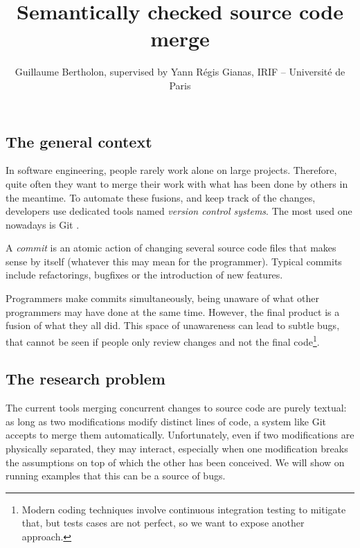 \documentclass[a4paper,11pt]{article}
\title{Semantically checked source code merge}
\author{Guillaume Bertholon, supervised by Yann Régis Gianas, IRIF -- Université de Paris}
\newcommand\todo[1]{{\color{teal}(\textbf{TODO:} #1)}}
\begin{document}
\maketitle


\subsection*{The general context}


In software engineering, people rarely work alone on large
projects. Therefore, quite often they want to merge their work with
what has been done by others in the meantime.
%
To automate these fusions, and keep track of the changes, developers use dedicated tools named \textit{version control systems}. The most used one nowadays is Git \cite{git}.

A \textit{commit} is an atomic action of changing several source code
files that makes sense by itself (whatever this may mean for the
programmer). Typical commits include refactorings, bugfixes or the
introduction of new features.

Programmers make commits simultaneously, being unaware of what other
programmers may have done at the same time. However, the final product
is a fusion of what they all did. This space of unawareness can lead
to subtle bugs, that cannot be seen if people only review changes and
not the final code\footnote{Modern coding techniques involve
  continuous integration testing to mitigate that, but tests cases are
  not perfect, so we want to expose another approach.}.

\subsection*{The research problem}


The current tools merging concurrent changes to source code are
purely textual: as long as two modifications modify distinct lines of
code, a system like Git accepts to merge them
automatically. Unfortunately, even if two modifications are physically
separated, they may interact, especially when one modification breaks
the assumptions on top of which the other has been conceived.
We will show on running examples that this can be a source of bugs.
\end{document}
